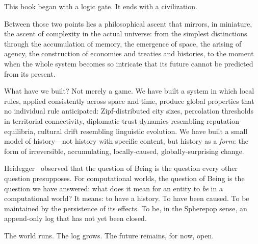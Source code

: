 \documentclass[11pt,a4paper,openany]{book}
\theoremstyle{plain}
\theoremstyle{definition}
\theoremstyle{remark}
\newenvironment{perspective}{%
  \begin{mdframed}[
    linecolor=spherered!40, backgroundcolor=spherered!4,
    linewidth=1pt, innertopmargin=8pt, innerbottommargin=8pt,
    innerleftmargin=10pt, innerrightmargin=10pt,
    skipabove=10pt, skipbelow=6pt
  ]%
  \setlength{\parindent}{0pt}%
  \noindent{\textcolor{spherered}{\textbf{Perspective}}}\par\smallskip\ignorespaces
}{\end{mdframed}}
\begin{document}
\begin{perspective}
  This book began with a logic gate. It ends with a civilization.

  Between those two points lies a philosophical ascent that mirrors, in
  miniature, the ascent of complexity in the actual universe: from the
  simplest distinctions through the accumulation of memory, the emergence
  of space, the arising of agency, the construction of economies and
  treaties and histories, to the moment when the whole system becomes
  so intricate that its future cannot be predicted from its present.

  What have we built? Not merely a game. We have built a system in which
  local rules, applied consistently across space and time, produce global
  properties that no individual rule anticipated: Zipf-distributed city
  sizes, percolation thresholds in territorial connectivity, diplomatic
  trust dynamics resembling reputation equilibria, cultural drift
  resembling linguistic evolution. We have built a small model of
  history---not history with specific content, but history as a
  \emph{form}: the form of irreversible, accumulating, locally-caused,
  globally-surprising change.

  Heidegger~\cite{Heidegger} observed that the question of Being is the
  question every other question presupposes. For computational worlds,
  the question of Being is the question we have answered: what does it
  mean for an entity to \emph{be} in a computational world? It means:
  to have a history. To have been caused. To be maintained by the
  persistence of its effects. To be, in the Spherepop sense, an
  append-only log that has not yet been closed.

  The world runs. The log grows. The future remains, for now, open.
\end{perspective}
\end{document}
